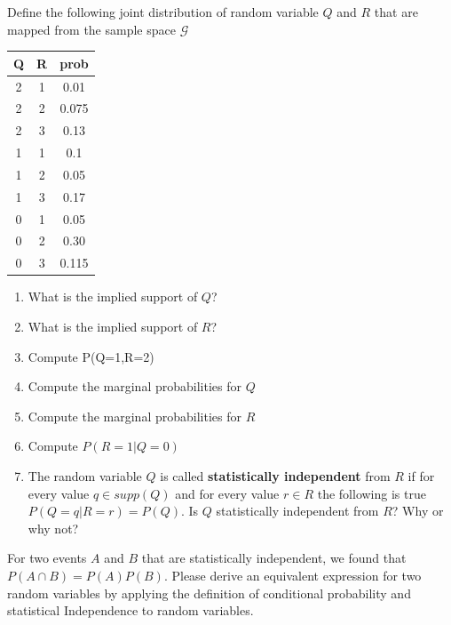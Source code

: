 \begin{enumerate}
    \item  Define the following joint distribution of random variable $Q$ and $R$ that are mapped from the sample space $\mathcal{G}$
    \begin{table}[ht!]
    \centering
    \begin{tabular}{c c | c}
        Q & R & prob \\
        \hline
        2 & 1 & 0.01\\
        2 & 2 & 0.075\\
        2 & 3 & 0.13\\
        1 & 1 & 0.1\\
        1 & 2 & 0.05\\
        1 & 3 & 0.17\\
        0 & 1 & 0.05\\
        0 & 2 & 0.30\\
        0 & 3 & 0.115
    \end{tabular}
    \begin{enumerate}
        \item What is the implied support of $Q$?
        \item What is the implied support of $R$?
        \item Compute P(Q=1,R=2)
        \item Compute the marginal probabilities for $Q$
        \item Compute the marginal probabilities for $R$
        \item Compute $P(R=1 | Q=0)$
        \item The random variable $Q$ is called \textbf{statistically independent} from $R$ if for every value $q \in supp(Q)$ and for every value $r \in R$ the following is true $P(Q=q |R=r) = P(Q)$. Is $Q$ statistically independent from $R$? Why or why not?
    \end{enumerate}
    \item For two events $A$ and $B$ that are statistically independent, we found that $P(A \cap B) = P(A)P(B)$. Please derive an equivalent expression for two random variables by applying the definition of conditional probability and statistical Independence to random variables.
\end{table}
    
\end{enumerate}


